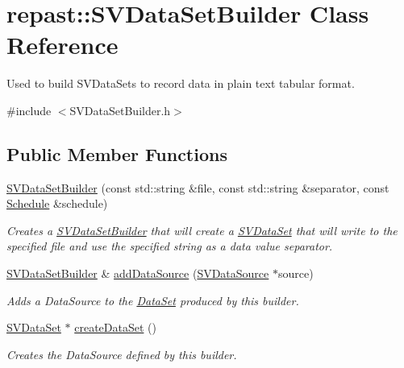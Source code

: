 \hypertarget{classrepast_1_1_s_v_data_set_builder}{\section{repast\-:\-:S\-V\-Data\-Set\-Builder Class Reference}
\label{classrepast_1_1_s_v_data_set_builder}
}


Used to build S\-V\-Data\-Sets to record data in plain text tabular format.  




{\ttfamily \#include $<$S\-V\-Data\-Set\-Builder.\-h$>$}

\subsection*{Public Member Functions}
\begin{DoxyCompactItemize}
\item 
\hyperlink{classrepast_1_1_s_v_data_set_builder_a859c517b2469745dc3ac66843f987285}{S\-V\-Data\-Set\-Builder} (const std\-::string \&file, const std\-::string \&separator, const \hyperlink{classrepast_1_1_schedule}{Schedule} \&schedule)
\begin{DoxyCompactList}\small\item\em Creates a \hyperlink{classrepast_1_1_s_v_data_set_builder}{S\-V\-Data\-Set\-Builder} that will create a \hyperlink{classrepast_1_1_s_v_data_set}{S\-V\-Data\-Set} that will write to the specified file and use the specified string as a data value separator. \end{DoxyCompactList}\item 
\hyperlink{classrepast_1_1_s_v_data_set_builder}{S\-V\-Data\-Set\-Builder} \& \hyperlink{classrepast_1_1_s_v_data_set_builder_ac81c7b7d834d9332e8cbdd4ae7c0010a}{add\-Data\-Source} (\hyperlink{classrepast_1_1_s_v_data_source}{S\-V\-Data\-Source} $\ast$source)
\begin{DoxyCompactList}\small\item\em Adds a Data\-Source to the \hyperlink{classrepast_1_1_data_set}{Data\-Set} produced by this builder. \end{DoxyCompactList}\item 
\hyperlink{classrepast_1_1_s_v_data_set}{S\-V\-Data\-Set} $\ast$ \hyperlink{classrepast_1_1_s_v_data_set_builder_a2c69751064d7746c47dbc2793b0fb01f}{create\-Data\-Set} ()
\begin{DoxyCompactList}\small\item\em Creates the Data\-Source defined by this builder. \end{DoxyCompactList}\end{DoxyCompactItemize}


